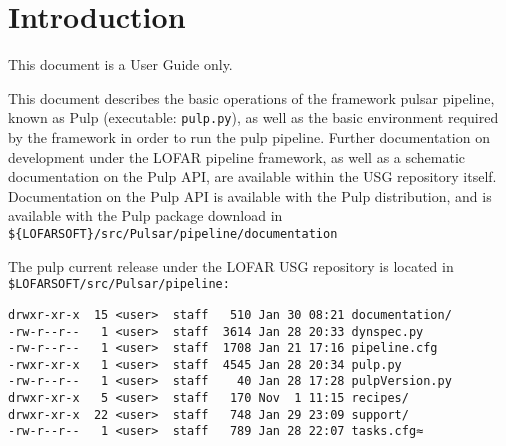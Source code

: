 \documentclass[a4paper,10pt,bibtotoc]{scrartcl}
\begin{document}
\section{Introduction}
\label{sec:introduction}
This document is a User Guide only.

This document describes the basic operations of the framework
pulsar pipeline, known as Pulp (executable: \verb|pulp.py|), as well as
the basic environment required by the framework in order to run the pulp
pipeline. Further documentation on
development under the LOFAR pipeline framework, as well as a schematic
documentation on the Pulp API, are available within the USG repository itself.
Documentation on the Pulp API is available with the Pulp distribution, and is available with the Pulp package download in
\verb|${LOFARSOFT}/src/Pulsar/pipeline/documentation|

The pulp current release under the LOFAR USG repository is located in \\
\verb|$LOFARSOFT/src/Pulsar/pipeline:|
\begin{verbatim}
drwxr-xr-x  15 <user>  staff   510 Jan 30 08:21 documentation/
-rw-r--r--   1 <user>  staff  3614 Jan 28 20:33 dynspec.py
-rw-r--r--   1 <user>  staff  1708 Jan 21 17:16 pipeline.cfg
-rwxr-xr-x   1 <user>  staff  4545 Jan 28 20:34 pulp.py
-rw-r--r--   1 <user>  staff    40 Jan 28 17:28 pulpVersion.py
drwxr-xr-x   5 <user>  staff   170 Nov  1 11:15 recipes/
drwxr-xr-x  22 <user>  staff   748 Jan 29 23:09 support/
-rw-r--r--   1 <user>  staff   789 Jan 28 22:07 tasks.cfg≈
\end{verbatim}
\end{document}
